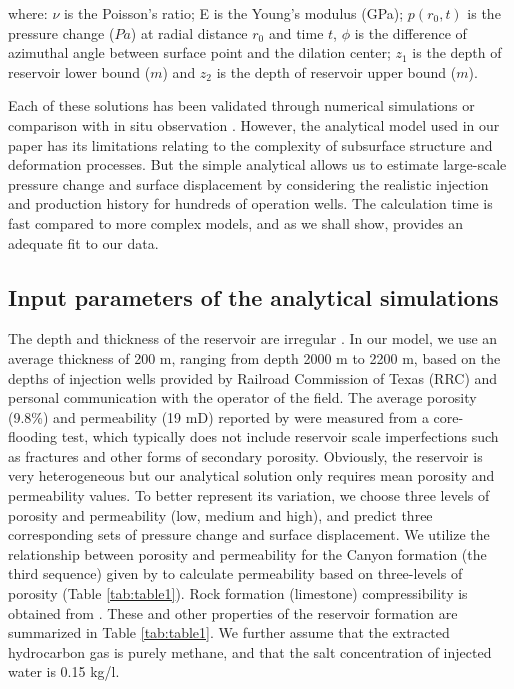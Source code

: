 where:
$\nu$ is the Poisson’s ratio; E is the Young’s modulus (GPa); $p(r_0,t)$  is the pressure change ($Pa$) at radial distance $r_0$ and time $t$,  $\phi$ is the difference of azimuthal angle between surface point and the dilation center; $z_1$ is the depth of reservoir lower bound ($m$) and $z_2$ is the depth of reservoir upper bound ($m$). 

Each of these solutions has been validated through numerical simulations \cite[]{xu2012fluid,mathias2009approximate} or comparison with in situ observation \cite[]{theis1935relation}. However, the analytical model used in our paper has its limitations relating to the complexity of subsurface structure and deformation processes.  But the simple analytical allows us to estimate large-scale pressure change and surface displacement by considering the realistic injection and production history for hundreds of operation wells.  The calculation time is fast compared to more complex models, and as we shall show, provides an adequate fit to our data. 

\subsection{Input parameters of the analytical simulations}
The depth and thickness of the reservoir are irregular \cite[]{han2010evaluation}.  In our model, we use an average thickness of 200 m, ranging from depth 2000 m to 2200 m, based on the depths of injection wells provided by Railroad Commission of Texas (RRC) and personal communication with the operator of the field.  The average porosity (9.8\%) and permeability (19 mD) reported by \citet{raines66} were measured from a core-flooding test, which typically does not include reservoir scale imperfections such as fractures and other forms of secondary porosity. Obviously, the reservoir is very heterogeneous \cite[]{han2010evaluation} but our analytical solution only requires mean porosity and permeability values.  To better represent its variation, we choose three levels of porosity and permeability (low, medium and high), and predict three corresponding sets of pressure change and surface displacement.  We utilize the relationship between porosity and permeability for the Canyon formation (the third sequence) given by \citet{lucia2004permeability} to calculate permeability based on three-levels of porosity (Table \ref{tab:table1}).  Rock formation (limestone) compressibility is obtained from \citet{newman1973pore}.  These and other properties of the reservoir formation are summarized in Table \ref{tab:table1}.  We further assume that the extracted hydrocarbon gas is purely methane, and that the salt concentration of injected water is 0.15 kg/l.

